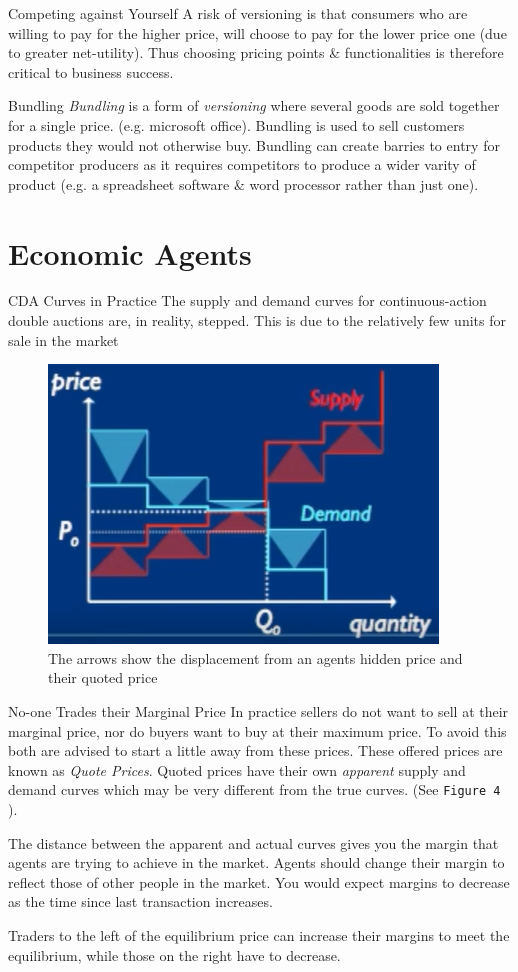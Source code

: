 \documentclass[11pt,a4paper]{article}
\begin{document}
\begin{proposition}{Competing against Yourself}
  A risk of versioning is that consumers who are willing to pay for the higher price, will choose to pay for the lower price one (due to greater net-utility). Thus choosing pricing points \& functionalities is therefore critical to business success.
\end{proposition}

\begin{proposition}{Bundling}
  \textit{Bundling} is a form of \textit{versioning} where several goods are sold together for a single price. (e.g. microsoft office). Bundling is used to sell customers products they would not otherwise buy. Bundling can create barries to entry for competitor producers as it requires competitors to produce a wider varity of product (e.g. a spreadsheet software \& word processor rather than just one).
\end{proposition}

\section{Economic Agents}

\begin{remark}{CDA Curves in Practice}
  The supply and demand curves for continuous-action double auctions are, in reality, stepped. This is due to the relatively few units for sale in the market
\end{remark}

\begin{figure}[ht!]
  \centering
  \includegraphics[width=.3\textwidth]{quotedPrices.PNG}
  \caption{The arrows show the displacement from an agents hidden price and their quoted price}
\end{figure}

\begin{proposition}{No-one Trades their Marginal Price}
  In practice sellers do not want to sell at their marginal price, nor do buyers want to buy at their maximum price. To avoid this both are advised to start a little away from these prices. These offered prices are known as \textit{Quote Prices}. Quoted prices have their own \textit{apparent} supply and demand curves which may be very different from the true curves. (See \texttt{Figure 4} ).
  \par The distance between the apparent and actual curves gives you the margin that agents are trying to achieve in the market. Agents should change their margin to reflect those of other people in the market. You would expect margins to decrease as the time since last transaction increases.
  \par Traders to the left of the equilibrium price can increase their margins to meet the equilibrium, while those on the right have to decrease.
\end{proposition}
\end{document}
